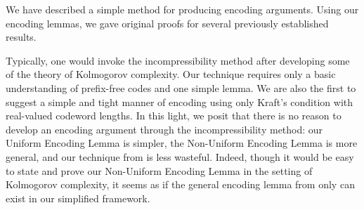\documentclass{patmorin}
\begin{document}
We have described a simple method for producing encoding
arguments. Using our encoding lemmas, we gave original proofs for
several previously established results.

Typically, one would invoke the incompressibility method after
developing some of the theory of Kolmogorov complexity. Our technique
requires only a basic understanding of prefix-free codes and one
simple lemma. We are also the first to suggest a simple and tight
manner of encoding using only Kraft's condition with real-valued
codeword lengths. In this light, we posit that there is no reason to
develop an encoding argument through the incompressibility method: our
Uniform Encoding Lemma is simpler, the Non-Uniform Encoding Lemma is
more general, and our technique from  is less
wasteful. Indeed, though it would be easy to state and prove our
Non-Uniform Encoding Lemma in the setting of Kolmogorov complexity, it
seems as if the general encoding lemma from  only can exist
in our simplified framework.

\end{document}
